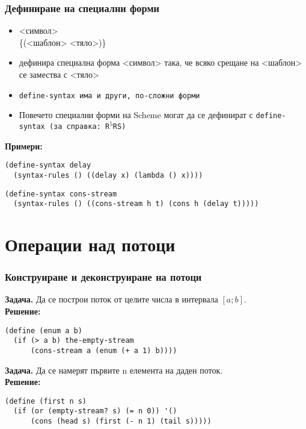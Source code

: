 \documentclass{beamer}
\begin{document}
\begin{frame}[fragile]
  \frametitle{Дефиниране на специални форми}

  \begin{itemize}[<+->]
  \item {} <символ>\\
    \hspace{5ex}\{\tta(<шаблон> <тяло>\tta)\}\tta{))}
  \item дефинира специална форма <символ> така, че всяко срещане на <шаблон> се замества с <тяло>
  \item \tt{define-syntax} има и други, по-сложни форми
  \item Повечето специални форми на Scheme могат да се дефинират с \tt{define-syntax} (за справка: R$^5$RS)
  \end{itemize}
  \onslide<+->
  \textbf{Примери:}
  \onslide<+->
\begin{lstlisting}
(define-syntax delay
  (syntax-rules () ((delay x) (lambda () x))))
\end{lstlisting}
  \onslide<+->
\begin{lstlisting}
(define-syntax cons-stream
  (syntax-rules () ((cons-stream h t) (cons h (delay t)))))
\end{lstlisting}
\end{frame}

\section{Операции над потоци}

\begin{frame}[fragile]
  \frametitle{Конструиране и деконструиране на потоци}

  \textbf{Задача.} Да се построи поток от целите числа в интервала $[a; b]$.\\
  \pause
  \textbf{Решение:}
\begin{lstlisting}
(define (enum a b)
  (if (> a b) the-empty-stream
      (cons-stream a (enum (+ a 1) b))))
\end{lstlisting}
  \pause
  \textbf{Задача.} Да се намерят първите n елемента на даден поток.\\
  \pause
  \textbf{Решение:}
\begin{lstlisting}
(define (first n s)
  (if (or (empty-stream? s) (= n 0)) '()
      (cons (head s) (first (- n 1) (tail s)))))
\end{lstlisting}
\end{frame}
\end{document}
